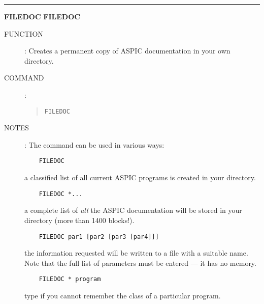 \goodbreak
\rule{\textwidth}{0.3mm}
{\Large {\bf FILEDOC} \hfill {\bf FILEDOC}}
\begin{description}
\item [FUNCTION]:
Creates a permanent copy of ASPIC documentation in your own directory.
\item [COMMAND]:
\begin{quote}
{\tt FILEDOC}
\end{quote}
\item [NOTES]:
The command can be used in various ways:
\begin{verbatim}
    FILEDOC
\end{verbatim}
a classified list of all current ASPIC programs is created in your directory.
\begin{verbatim}
    FILEDOC *...
\end{verbatim}
a complete list of {\em all} the ASPIC documentation will be stored in your
directory (more than 1400 blocks!).
\begin{verbatim}
    FILEDOC par1 [par2 [par3 [par4]]]
\end{verbatim}
the information requested will be written to a file with a suitable name.
Note that the full list of parameters must be entered --- it has no memory.
\begin{verbatim}
    FILEDOC * program
\end{verbatim}
type if you cannot remember the class of a particular program.
\end{description}


